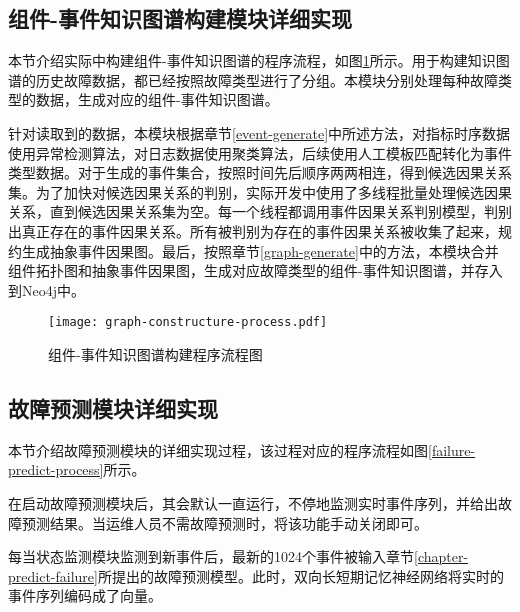 


\subsection{组件-事件知识图谱构建模块详细实现}
本节介绍实际中构建组件-事件知识图谱的程序流程，如图\ref{graph-constructure-process}所示。用于构建知识图谱的历史故障数据，都已经按照故障类型进行了分组。本模块分别处理每种故障类型的数据，生成对应的组件-事件知识图谱。

针对读取到的数据，本模块根据章节\ref{event-generate}中所述方法，对指标时序数据使用异常检测算法，对日志数据使用聚类算法，后续使用人工模板匹配转化为事件类型数据。对于生成的事件集合，按照时间先后顺序两两相连，得到候选因果关系集。为了加快对候选因果关系的判别，实际开发中使用了多线程批量处理候选因果关系，直到候选因果关系集为空。每一个线程都调用事件因果关系判别模型，判别出真正存在的事件因果关系。所有被判别为存在的事件因果关系被收集了起来，规约生成抽象事件因果图。最后，按照章节\ref{graph-generate}中的方法，本模块合并组件拓扑图和抽象事件因果图，生成对应故障类型的组件-事件知识图谱，并存入到Neo4j中。
\begin{figure}[htbp]
    \centering
    \texttt{[image: graph-constructure-process.pdf]}
    \caption{组件-事件知识图谱构建程序流程图\label{graph-constructure-process}}
\end{figure}

\subsection{故障预测模块详细实现}
本节介绍故障预测模块的详细实现过程，该过程对应的程序流程如图\ref{failure-predict-process}所示。

在启动故障预测模块后，其会默认一直运行，不停地监测实时事件序列，并给出故障预测结果。当运维人员不需故障预测时，将该功能手动关闭即可。

每当状态监测模块监测到新事件后，最新的1024个事件被输入章节\ref{chapter-predict-failure}所提出的故障预测模型。此时，双向长短期记忆神经网络将实时的事件序列编码成了向量。

